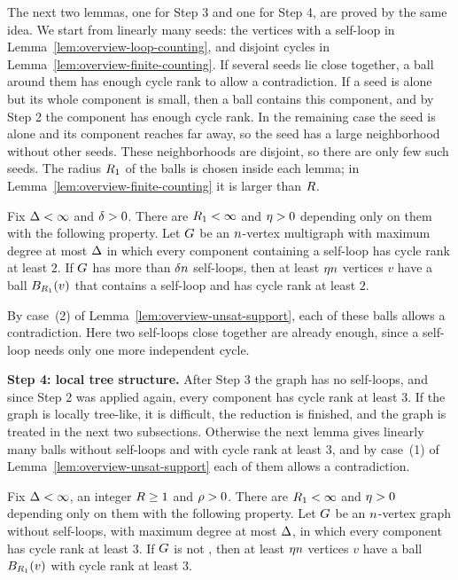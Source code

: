 The next two lemmas, one for Step 3 and one for Step 4, are proved by the same
idea. We start from linearly many seeds: the vertices with a self-loop in
Lemma~\ref{lem:overview-loop-counting}, and disjoint cycles in
Lemma~\ref{lem:overview-finite-counting}. If several seeds lie close together,
a ball around them has enough cycle rank to allow a contradiction. If a seed is
alone but its whole component is small, then a ball contains this component,
and by Step 2 the component has enough cycle rank. In the remaining case the
seed is alone and its component reaches far away, so the seed has a large
neighborhood without other seeds. These neighborhoods are disjoint, so there
are only few such seeds. The radius \(R_1\) of the balls is chosen inside
each lemma; in Lemma~\ref{lem:overview-finite-counting} it is larger than
\(R\).

\begin{lemma}\label{lem:overview-loop-counting}
Fix \(\Delta<\infty\) and \(\delta>0\). There are \(R_1<\infty\) and
\(\eta>0\) depending only on them with the following property. Let \(G\) be
an \(n\)-vertex multigraph with maximum degree at most \(\Delta\) in which
every component containing a self-loop has cycle rank at least \(2\). If \(G\)
has more than \(\delta n\) self-loops, then at least \(\eta n\) vertices
\(v\) have a ball \(B_{R_1}(v)\) that contains a self-loop and has cycle
rank at least \(2\).
\end{lemma}

By case~(2) of Lemma~\ref{lem:overview-unsat-support}, each of these balls
allows a contradiction. Here two self-loops close together are already enough,
since a self-loop needs only one more independent cycle.

\medskip
\noindent\textbf{Step 4: local tree structure.} After Step 3 the graph has no
self-loops, and since Step 2 was applied again, every component has cycle rank
at least \(3\). If the graph is
locally tree-like, it is difficult, the reduction is finished, and the graph is
treated in the next two subsections. Otherwise the next lemma gives linearly many balls
without self-loops and with cycle rank at least \(3\), and by case~(1) of
Lemma~\ref{lem:overview-unsat-support} each of them allows a contradiction.

\begin{lemma}\label{lem:overview-finite-counting}
Fix \(\Delta<\infty\), an integer \(R\ge1\) and \(\rho>0\). There are
\(R_1<\infty\) and \(\eta>0\) depending only on them with the following
property. Let \(G\) be an \(n\)-vertex graph without self-loops, with
maximum degree at most \(\Delta\), in which every component has cycle rank at
least \(3\). If \(G\) is not \loctree{\rad}{\nontree}, then at least
\(\eta n\) vertices \(v\) have a ball \(B_{R_1}(v)\) with cycle rank
at least \(3\).
\end{lemma}

